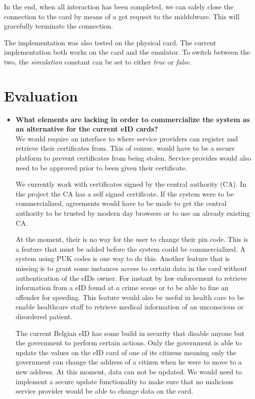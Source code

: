 \documentclass[12pt]{report}
\begin{document}
In the end, when all interaction has been completed, we can safely close the connection to the card by means of a get request to the middelware. This will gracefully terminate the connection.

The implementation was also tested on the physical card. The current implementation both works on the card and the emulator. To switch between the two, the \emph{simulation} constant can be set to either \emph{true} or \emph{false}.

\section{Evaluation}
\begin{itemize}
\item \textbf{What elements are lacking in order to commercialize the system as an alternative for the current eID cards?}\\ 
We would require an interface to where service providers can register and retrieve their certificates from. This of course, would have to be a secure platform to prevent certificates from being stolen. Service provides would also need to be approved prior to been given their certificate.

We currently work with certificates signed by the central authority (CA). In the project the CA has a self signed certificate. If the system were to be commercialized, agreements would have to be made to get the central authority to be trusted by modern day browsers or to use an already existing CA.

At the moment, their is no way for the user to change their pin code. This is a feature that must be added before the system could be commercialized. A system using PUK codes is one way to do this. Another feature that is missing is to grant some instances access to certain data in the card without authentication of the eIDs owner. For instant by law enforcement to retrieve information from a eID found at a crime scene or to be able to fine an offender for speeding. This feature would also be useful in health care to be enable healthcare staff to retrieve medical information of an unconscious or disordered patient.

The current Belgian eID has some build in security that disable anyone but the government to perform certain actions. Only the government is able to update the values on the eID card of one of its citizens meaning only the government can change the address of a citizen when he were to move to a new address. At this moment, data can not be updated. We would need to implement a secure update functionality to make sure that no malicious service provider would be able to change data on the card.


\end{itemize}
\end{document}
